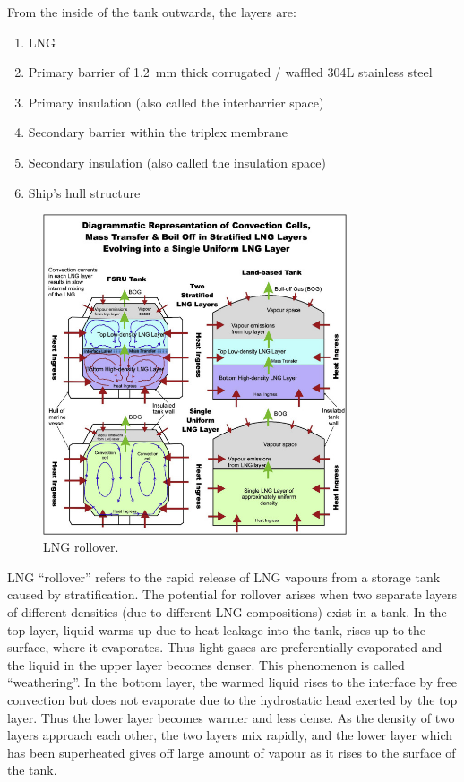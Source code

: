 From the inside of the tank outwards, the layers are:
\begin{enumerate}
    \item LNG
    \item Primary barrier of \SI{1.2}{\milli\meter} thick corrugated / waffled 304L stainless steel
    \item Primary insulation (also called the interbarrier space)
    \item Secondary barrier within the triplex membrane
    \item Secondary insulation (also called the insulation space)
    \item Ship's hull structure
\end{enumerate}
\begin{figure}[H]
    \centering
    \includegraphics[width = 0.8\textwidth]{img/figure63.jpg}
    \caption{LNG rollover.}
\end{figure}
LNG ``rollover'' refers to the rapid release of LNG vapours from a storage tank caused by stratification. The potential for rollover arises when two separate layers of different densities (due to different LNG compositions) exist in a tank. In the top layer, liquid warms up due to heat leakage into the tank, rises up to the surface, where it evaporates. Thus light gases are preferentially evaporated and the liquid in the upper layer becomes denser. This phenomenon is called ``weathering''. In the bottom layer, the warmed liquid rises to the interface by free convection but does not evaporate due to the hydrostatic head exerted by the top layer. Thus the lower layer becomes warmer and less dense. As the density of two layers approach each other, the two layers mix rapidly, and the lower layer which has been superheated gives off large amount of vapour as it rises to the surface of the tank.
